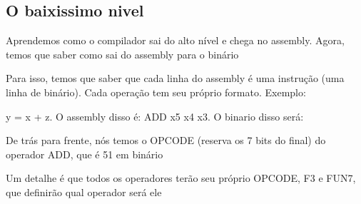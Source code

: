 \documentclass[12pt,a4paper]{report}
\begin{document}
	
	\subsection{O baixissimo nivel}
	
	Aprendemos como o compilador sai do alto nível e chega no assembly. Agora, temos que saber como sai do assembly para o binário
	
	Para isso, temos que saber que cada linha do assembly é uma instrução (uma linha de binário). Cada operação tem seu próprio formato. Exemplo:
	
	y = x + z. O assembly disso é: ADD x5 x4 x3. O binario disso será:
	
	
	
	De trás para frente, nós temos o OPCODE (reserva os 7 bits do final)  do operador ADD, que é 51 em binário
	
	
	Um detalhe é que todos os operadores terão seu próprio OPCODE, F3 e FUN7, que definirão qual operador será ele
	
	
\end{document}
